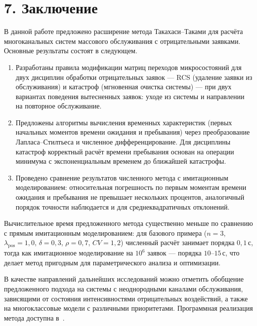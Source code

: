 \section*{7. Заключение}
В данной работе предложено расширение метода Такахаси--Таками для расчёта многоканальных систем массового обслуживания с отрицательными заявками. Основные результаты состоят в следующем.
\begin{enumerate}[leftmargin=1.5em]
  \item Разработаны правила модификации матриц переходов микросостояний для двух дисциплин обработки отрицательных заявок --- RCS (удаление заявки из обслуживания) и катастроф (мгновенная очистка системы) --- при двух вариантах поведения вытесненных заявок: уходе из системы и направлении на повторное обслуживание.
  \item Предложены алгоритмы вычисления временных характеристик (первых начальных моментов времени ожидания и пребывания) через преобразование Лапласа--Стилтьеса и численное дифференцирование. Для дисциплины катастроф корректный расчёт времени пребывания основан на операции минимума с экспоненциальным временем до ближайшей катастрофы.
  \item Проведено сравнение результатов численного метода с имитационным моделированием: относительная погрешность по первым моментам времени ожидания и пребывания не превышает нескольких процентов, аналогичный порядок точности наблюдается и для среднеквадратичных отклонений.
\end{enumerate}

Вычислительное время предложенного метода существенно меньше по сравнению с прямым имитационным моделированием: для базового примера (\(n=3\), \(\lambda_{\mathrm{pos}}=1{,}0\), \(\delta=0{,}3\), \(\rho=0{,}7\), \(CV=1{,}2\)) численный расчёт занимает порядка \(0{,}1\)\,с, тогда как имитационное моделирование на \(10^6\) заявок --- порядка \(10\)--\(15\)\,с, что делает метод пригодным для параметрического анализа и оптимизации.

В качестве направлений дальнейших исследований можно отметить обобщение предложенного подхода на системы с неоднородными каналами обслуживания, зависящими от состояния интенсивностями отрицательных воздействий, а также на многоклассовые модели с различными приоритетами. Программная реализация метода доступна в~\cite{mostqueue2026}.



